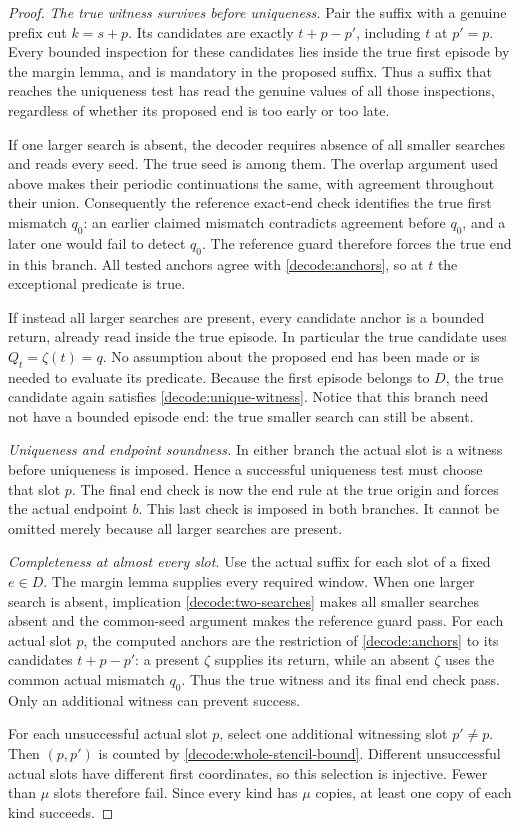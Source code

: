 \begin{proof}
\emph{The true witness survives before uniqueness.} Pair the suffix
with a genuine prefix cut $k=s+p$. Its candidates are exactly
$t+p-p'$, including $t$ at $p'=p$. Every bounded inspection for these
candidates lies inside the true first episode by the margin lemma, and
is mandatory in the proposed suffix. Thus a suffix that reaches the
uniqueness test has read the genuine values of all those inspections,
regardless of whether its proposed end is too early or too late.

If one larger search is absent, the decoder requires absence of all
smaller searches and reads every seed. The true seed is among them.
The overlap argument used above makes their periodic continuations the
same, with agreement throughout their union. Consequently the reference
exact-end check identifies the true first mismatch $q_0$: an earlier
claimed mismatch contradicts agreement before $q_0$, and a later one
would fail to detect $q_0$. The reference guard therefore forces the true
end in this branch. All tested anchors agree with
\eqref{decode:anchors}, so at $t$ the exceptional predicate is true.

If instead all larger searches are present, every candidate anchor is a
bounded return, already read inside the true episode. In particular the
true candidate uses $Q_t=\zeta(t)=q$. No assumption about the proposed
end has been made or is needed to evaluate its predicate. Because the
first episode belongs to $D$, the true candidate again satisfies
\eqref{decode:unique-witness}. Notice that this branch need not have a
bounded episode end: the true smaller search can still be absent.

\emph{Uniqueness and endpoint soundness.} In either branch the actual
slot is a witness before uniqueness is imposed. Hence a successful
uniqueness test must choose that slot $p$. The final end check is now the
end rule at the true origin and forces the actual endpoint $b$. This
last check is imposed in both branches. It cannot be omitted merely
because all larger searches are present.

\emph{Completeness at almost every slot.} Use the actual suffix for each
slot of a fixed $e\in D$. The margin lemma supplies every required
window. When one larger search is absent, implication
\eqref{decode:two-searches} makes all smaller searches absent and the
common-seed argument makes the reference guard pass. For each actual slot
$p$, the computed anchors are the restriction of \eqref{decode:anchors}
to its candidates $t+p-p'$: a present $\zeta$ supplies its return,
while an absent $\zeta$ uses the common actual mismatch $q_0$.
Thus the true witness and its final end check pass. Only an additional
witness can prevent success.

For each unsuccessful actual slot $p$, select one additional witnessing
slot $p'\ne p$. Then $(p,p')$ is counted by
\eqref{decode:whole-stencil-bound}. Different unsuccessful actual slots
have different first coordinates, so this selection is injective.
Fewer than $\mu$ slots therefore fail. Since every kind has $\mu$
copies, at least one copy of each kind succeeds.
\end{proof}

